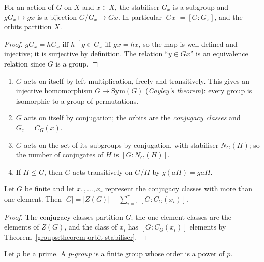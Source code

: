 \begin{theorem}\label{groups:theorem-orbit-stabiliser}
For an action of $G$ on $X$ and $x \in X$, the stabiliser $G_x$ is a subgroup and
$gG_x \mapsto gx$ is a bijection $G/G_x \to Gx$. In particular
$|Gx| = [G : G_x]$, and the orbits partition $X$.
\end{theorem}

\begin{proof}
$gG_x = hG_x$ iff $h^{-1}g \in G_x$ iff $gx = hx$, so the map is well defined and
injective; it is surjective by definition. The relation ``$y \in Gx$'' is an
equivalence relation since $G$ is a group.
\end{proof}

\begin{example}\label{groups:example-actions}
\begin{enumerate}
\item $G$ acts on itself by left multiplication, freely and transitively. This
gives an injective homomorphism $G \to \mathrm{Sym}(G)$ (\emph{Cayley's theorem}):
every group is isomorphic to a group of permutations.
\item $G$ acts on itself by conjugation; the orbits are the \emph{conjugacy
classes} and $G_x = C_G(x)$.
\item $G$ acts on the set of its subgroups by conjugation, with stabiliser
$N_G(H)$; so the number of conjugates of $H$ is $[G : N_G(H)]$.
\item If $H \leq G$, then $G$ acts transitively on $G/H$ by $g(aH) = gaH$.
\end{enumerate}
\end{example}

\begin{corollary}\label{groups:corollary-class-equation}
Let $G$ be finite and let $x_1, \ldots, x_r$ represent the conjugacy classes with
more than one element. Then $|G| = |Z(G)| + \sum_{i=1}^r [G : C_G(x_i)]$.
\end{corollary}

\begin{proof}
The conjugacy classes partition $G$; the one-element classes are the elements of
$Z(G)$, and the class of $x_i$ has $[G : C_G(x_i)]$ elements by
Theorem~\ref{groups:theorem-orbit-stabiliser}.
\end{proof}

\begin{definition}\label{groups:definition-p-group}
Let $p$ be a prime. A \emph{$p$-group} is a finite group whose order is a power
of $p$.
\end{definition}

